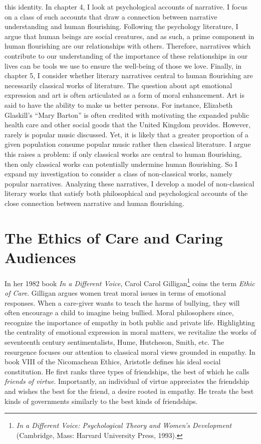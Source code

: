 \documentclass[phdthesis,12pt,final]{wuthesis}
\theoremstyle{definition}
\theoremstyle{definition}
\theoremstyle{definition}
\theoremstyle{definition}
\theoremstyle{remark}
\begin{document}
this identity. In chapter 4, I look at psychological accounts of narrative. I focus on a class of such accounts that draw a connection between narrative understanding and human flourishing. Following the psychology literature, I argue that human beings are social creatures, and as such, a prime component in human flourishing are our relationships with others. Therefore, narratives which contribute to our understanding of the importance of these relationships in our lives can be tools we use to ensure the well-being of those we love. Finally, in chapter 5, I consider whether literary narratives central to human flourishing are necessarily classical works of literature. The question about apt emotional expression and art is often articulated as a form of moral enhancement. Art is said to have the ability to make us better persons. For instance, Elizabeth Glaskill's ``Mary Barton'' is often credited with motivating the expanded public health care and other social goods that the United Kingdom provides. However, rarely is popular music discussed. Yet, it is likely that a greater proportion of a given population consume popular music rather then classical literature. I argue this raises a problem: if only classical works are central to human flourishing, then only classical works can potentially undermine human flourishing. So I expand my investigation to consider a class of non-classical works, namely popular narratives. Analyzing these narratives, I develop a model of non-classical literary works that satisfy both philosophical and psychological accounts of the close connection between narrative and human flourishing.

\section{The Ethics of Care and Caring Audiences}\label{the-ethics-of-care-and-caring-audiences}

In her 1982 book \emph{In a Different Voice}, Carol Carol Gilligan\footnote{\emph{In a Different Voice: Psychological Theory and Women's Development} (Cambridge, Mass: Harvard University Press, 1993).} coins the term \emph{Ethic of Care}. Gilligan argues women treat moral issues in terms of emotional responses. When a care-giver wants to teach the harms of bullying, they will often encourage a child to imagine being bullied. Moral philosophers since, recognize the importance of empathy in both public and private life. Highlighting the centrality of emotional expression in moral matters, we revitalize the works of seventeenth century sentimentalists, Hume, Hutcheson, Smith, etc. The resurgence focuses our attention to classical moral views grounded in empathy. In book VIII of the Nicomachean Ethics, Aristotle defines his ideal social constitution. He first ranks three types of friendships, the best of which he calls \emph{friends of virtue}. Importantly, an individual of virtue appreciates the friendship and wishes the best for the friend, a desire rooted in empathy. He treats the best kinds of governments similarly to the best kinds of friendships.
\end{document}
